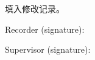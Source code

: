 \begin{revision}


	填入修改记录。


	\vspace{4em}

	\begin{flushright}
		\begin{minipage}{0.45\linewidth}

			Recorder (signature):
			\vspace{2mm}

			Supervisor (signature):
		\end{minipage}
	\end{flushright}
\end{revision}
